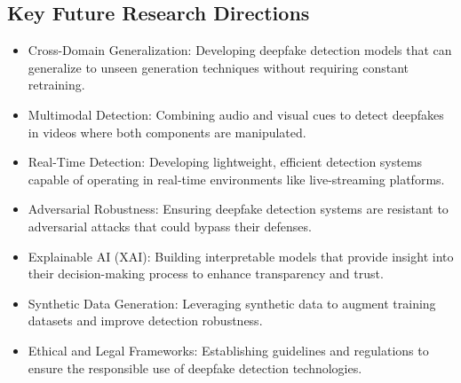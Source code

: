 \documentclass[lettersize,journal]{IEEEtran}
\begin{document}
\subsection{Key Future Research Directions}
\begin{itemize}
    \item Cross-Domain Generalization: Developing deepfake detection models that can generalize to unseen generation techniques without requiring constant retraining.

    \item Multimodal Detection: Combining audio and visual cues to detect deepfakes in videos where both components are manipulated.

    \item Real-Time Detection: Developing lightweight, efficient detection systems capable of operating in real-time environments like live-streaming platforms.

    \item Adversarial Robustness: Ensuring deepfake detection systems are resistant to adversarial attacks that could bypass their defenses.


    \item Explainable AI (XAI): Building interpretable models that provide insight into their decision-making process to enhance transparency and trust.

    \item Synthetic Data Generation: Leveraging synthetic data to augment training datasets and improve detection robustness.

    \item Ethical and Legal Frameworks: Establishing guidelines and regulations to ensure the responsible use of deepfake detection technologies.
\end{itemize}




\end{document}
